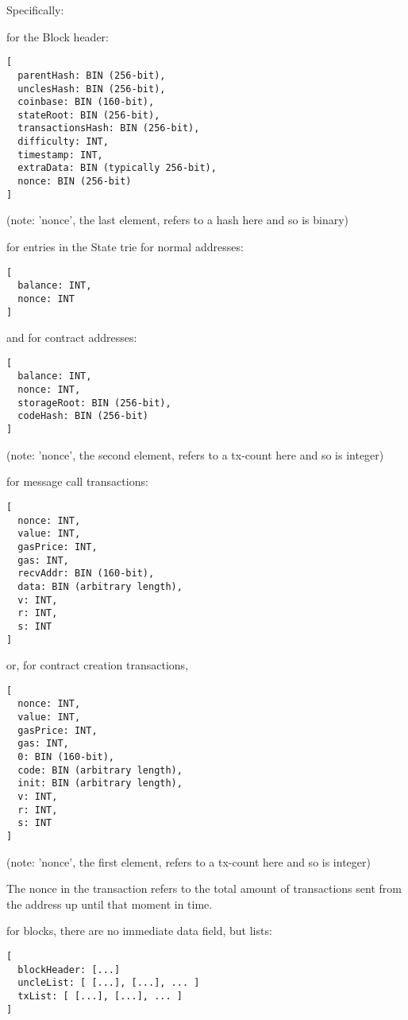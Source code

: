 \documentclass[9pt,oneside]{amsart}
\begin{document}
Specifically:

for the Block header:
\begin{verbatim}
[
  parentHash: BIN (256-bit),
  unclesHash: BIN (256-bit),
  coinbase: BIN (160-bit),
  stateRoot: BIN (256-bit),
  transactionsHash: BIN (256-bit),
  difficulty: INT,
  timestamp: INT,
  extraData: BIN (typically 256-bit),
  nonce: BIN (256-bit)
]
\end{verbatim}

(note: 'nonce', the last element, refers to a hash here and so is binary)

for entries in the State trie for normal addresses:
\begin{verbatim}
[
  balance: INT,
  nonce: INT
]
\end{verbatim}

and for contract addresses:
\begin{verbatim}
[
  balance: INT,
  nonce: INT,
  storageRoot: BIN (256-bit),
  codeHash: BIN (256-bit)
]
\end{verbatim}

(note: 'nonce', the second element, refers to a tx-count here and so is integer)

for message call transactions:

\begin{verbatim}
[
  nonce: INT,
  value: INT,
  gasPrice: INT,
  gas: INT,
  recvAddr: BIN (160-bit),
  data: BIN (arbitrary length),
  v: INT,
  r: INT,
  s: INT
]
\end{verbatim}

or, for contract creation transactions,

\begin{verbatim}
[
  nonce: INT,
  value: INT,
  gasPrice: INT,
  gas: INT,
  0: BIN (160-bit),
  code: BIN (arbitrary length),
  init: BIN (arbitrary length),
  v: INT,
  r: INT,
  s: INT
]
\end{verbatim}

(note: 'nonce', the first element, refers to a tx-count here and so is integer)

The nonce in the transaction refers to the total amount of transactions sent from the address up until that moment in time.

for blocks, there are no immediate data field, but lists:

\begin{verbatim}
[
  blockHeader: [...]
  uncleList: [ [...], [...], ... ]
  txList: [ [...], [...], ... ]
]
\end{verbatim}
\end{document}
